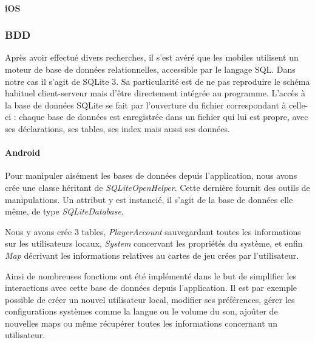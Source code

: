 		
		
		
		
		
	\paragraph{iOS\\}
		
	\subsubsection{BDD}

		Après avoir effectué divers recherches, il s'est avéré que les mobiles
		utilisent un moteur de base de données relationnelles, accessible par le
		langage SQL. Dans notre cas il s'agit de SQLite 3. Sa particularité est de ne
		pas reproduire le schéma habituel client-serveur mais d'être directement intégrée au programme.
		L'accès à la base de données SQLite se fait par l'ouverture du fichier
		correspondant à celle-ci : chaque base de données est enregistrée dans un fichier qui lui est propre,
		 avec ses déclarations, ses tables, ses index mais aussi ses données.
			
		\paragraph{Android\\}
			
			Pour manipuler aisément les bases de données depuis l'application,
			nous avons crée une classe héritant de \textit{SQLiteOpenHelper}. Cette
			dernière fournit des outils de manipulations. Un attribut y est
			instancié, il s'agit de la base de données elle même, de type
			\textit{SQLiteDatabase}.
			
			Nous y avons crée 3 tables, \textit{PlayerAccount} sauvegardant toutes les
			informations sur les utilisateurs locaux, \textit{System} concervant les
			propriétés du système, et enfin \textit{Map} décrivant les informations
			relatives au cartes de jeu crées par l'utilisateur.
			
			Ainsi de nombreuses	fonctions ont été implémenté dans le but de simplifier les interactions
			avec cette base de données depuis l'application. Il est par exemple possible de créer un nouvel 
			utilisateur local, modifier ses préférences, gérer les configurations systèmes comme la langue ou le volume
			du son, ajoûter de nouvelles maps ou même récupérer toutes les informations
			concernant un utilisateur.\\
			
